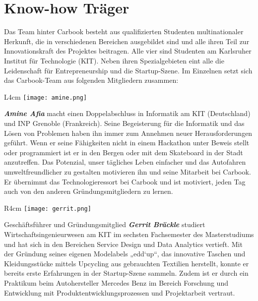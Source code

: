 \documentclass[12pt,ngerman, fleqn]{book} %
\begin{document}
\section{Know-how Träger}

Das Team hinter Carbook besteht aus qualifizierten Studenten multinationaler Herkunft, die in verschiedenen Bereichen ausgebildet sind und alle ihren Teil zur Innovationskraft des Projektes beitragen. Alle vier sind Studenten am Karlsruher Institut für Technologie (KIT). Neben ihren Spezialgebieten eint alle die Leidenschaft für Entrepreneurship und die Startup-Szene. Im Einzelnen setzt sich das Carbook-Team aus folgenden Mitgliedern zusammen: \linebreak

\begin{wrapfigure}{L}{4cm}%
\centering
\texttt{[image: amine.png]}
\end{wrapfigure} 
\textbf{\textit{Amine Afia}} macht einen Doppelabschluss in Informatik am KIT (Deutschland) und INP Grenoble (Frankreich). Seine Begeisterung für die Informatik und das Lösen von Problemen haben ihn immer zum Annehmen neuer Herausforderungen geführt. Wenn er seine Fähigkeiten nicht in einem Hackathon unter Beweis stellt oder programmiert ist er in den Bergen oder mit dem Skateboard in der Stadt anzutreffen. Das Potenzial, unser tägliches Leben einfacher und das Autofahren umweltfreundlicher zu gestalten motivieren ihn und seine Mitarbeit bei Carbook. Er übernimmt das Technologieressort bei Carbook und ist motiviert, jeden Tag auch von den anderen Gründungsmitgliedern zu lernen. \linebreak

\begin{wrapfigure}{R}{4cm}%
\centering
\texttt{[image: gerrit.png]}
\end{wrapfigure}
Geschäftsführer und Gründungsmitglied \textbf{\textit{Gerrit Bräckle}} studiert Wirtschaftsingenieurwesen am KIT im sechsten Fachsemester des Masterstudiums und hat sich in den Bereichen Service Design und Data Analytics vertieft. Mit der Gründung seines eigenen Modelabels „edd‘up“, das innovative Taschen und Kleidungsstücke mittels Upcycling aus gebrauchten Textilien herstellt, konnte er bereits erste Erfahrungen in der Startup-Szene sammeln. Zudem ist er durch ein Praktikum beim Autohersteller Mercedes Benz im Bereich Forschung und Entwicklung mit Produktentwicklungsprozessen und Projektarbeit vertraut.\linebreak
\end{document}
